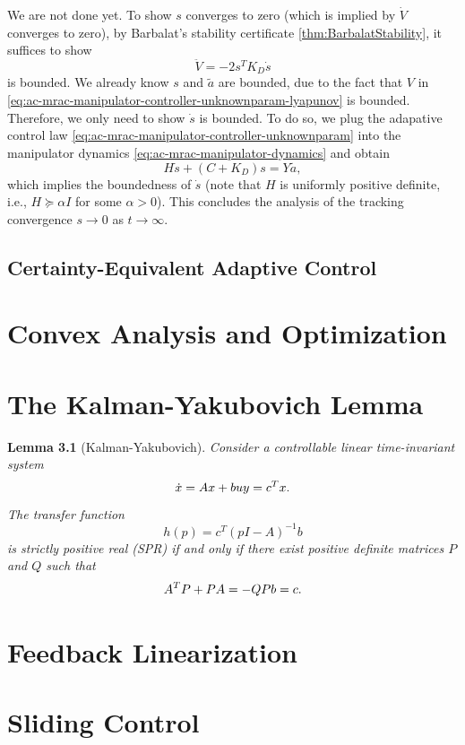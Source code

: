 \documentclass[
]{book}
\newtheorem{lemma}{Lemma}[chapter]
\theoremstyle{definition}
\theoremstyle{definition}
\theoremstyle{definition}
\theoremstyle{definition}
\theoremstyle{remark}
\begin{document}
We are not done yet. To show \(s\) converges to zero (which is implied by \(\dot{V}\) converges to zero), by Barbalat's stability certificate \ref{thm:BarbalatStability}, it suffices to show
\[
\ddot{V} = -2 s^T K_D \dot{s}
\]
is bounded. We already know \(s\) and \(\tilde{a}\) are bounded, due to the fact that \(V\) in \eqref{eq:ac-mrac-manipulator-controller-unknownparam-lyapunov} is bounded. Therefore, we only need to show \(\dot{s}\) is bounded. To do so, we plug the adapative control law \eqref{eq:ac-mrac-manipulator-controller-unknownparam} into the manipulator dynamics \eqref{eq:ac-mrac-manipulator-dynamics} and obtain
\[
H \dot{s} + (C + K_D) s = Y\tilde{a},
\]
which implies the boundedness of \(\dot{s}\) (note that \(H\) is uniformly positive definite, i.e., \(H \succeq \alpha I\) for some \(\alpha > 0\)). This concludes the analysis of the tracking convergence \(s \rightarrow 0\) as \(t \rightarrow \infty\).

\hypertarget{certainty-equivalent-adaptive-control}{%
\section{Certainty-Equivalent Adaptive Control}\label{certainty-equivalent-adaptive-control}}

\hypertarget{appendix-appendix}{%
\appendix}


\hypertarget{appconvex}{%
\chapter{Convex Analysis and Optimization}\label{appconvex}}

\hypertarget{the-kalman-yakubovich-lemma}{%
\chapter{The Kalman-Yakubovich Lemma}\label{the-kalman-yakubovich-lemma}}

\begin{lemma}[Kalman-Yakubovich]
\protect\hypertarget{lem:KalmanYakubovich}{}\label{lem:KalmanYakubovich}Consider a controllable linear time-invariant system
\[
\dot{x} = A x + b u \\
y = c^T x.
\]
The transfer function
\[
h(p) = c^T (p I - A)^{-1} b 
\]
is strictly positive real (SPR) if and only if there exist positive definite matrices \(P\) and \(Q\) such that
\[
A^T P + P A = - Q \\
Pb = c.
\]
\end{lemma}

\hypertarget{feedbacklinearization}{%
\chapter{Feedback Linearization}\label{feedbacklinearization}}

\hypertarget{slidingcontrol}{%
\chapter{Sliding Control}\label{slidingcontrol}}

  
\end{document}
